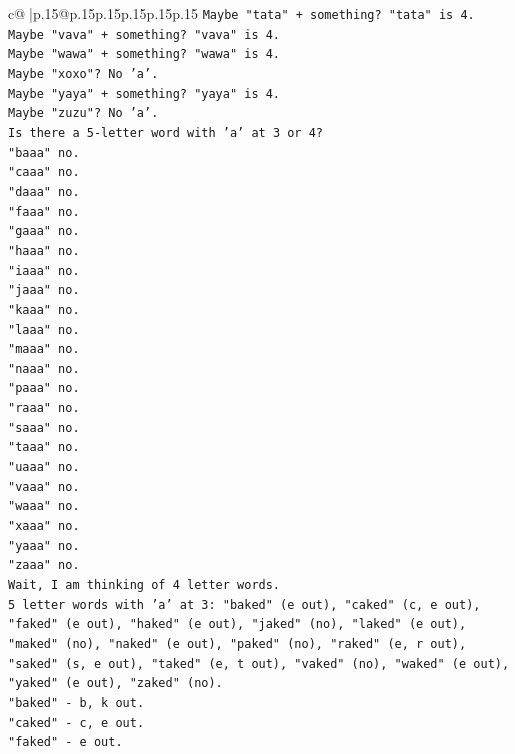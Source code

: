 \documentclass{article}
\begin{document}
{\begin{supertabular}{c@{$\;$}|p{.15\linewidth}@{}p{.15\linewidth}p{.15\linewidth}p{.15\linewidth}p{.15\linewidth}p{.15\linewidth}}
{{{\texttt{Maybe "tata" + something? "tata" is 4.} \\
\texttt{Maybe "vava" + something? "vava" is 4.} \\
\texttt{Maybe "wawa" + something? "wawa" is 4.} \\
\texttt{Maybe "xoxo"? No 'a'.} \\
\texttt{Maybe "yaya" + something? "yaya" is 4.} \\
\texttt{Maybe "zuzu"? No 'a'.} \\
\texttt{Is there a 5{-}letter word with 'a' at 3 or 4?} \\
\texttt{"baaa" no.} \\
\texttt{"caaa" no.} \\
\texttt{"daaa" no.} \\
\texttt{"faaa" no.} \\
\texttt{"gaaa" no.} \\
\texttt{"haaa" no.} \\
\texttt{"iaaa" no.} \\
\texttt{"jaaa" no.} \\
\texttt{"kaaa" no.} \\
\texttt{"laaa" no.} \\
\texttt{"maaa" no.} \\
\texttt{"naaa" no.} \\
\texttt{"paaa" no.} \\
\texttt{"raaa" no.} \\
\texttt{"saaa" no.} \\
\texttt{"taaa" no.} \\
\texttt{"uaaa" no.} \\
\texttt{"vaaa" no.} \\
\texttt{"waaa" no.} \\
\texttt{"xaaa" no.} \\
\texttt{"yaaa" no.} \\
\texttt{"zaaa" no.} \\
\texttt{Wait, I am thinking of 4 letter words.} \\
\texttt{5 letter words with 'a' at 3: "baked" (e out), "caked" (c, e out), "faked" (e out), "haked" (e out), "jaked" (no), "laked" (e out), "maked" (no), "naked" (e out), "paked" (no), "raked" (e, r out), "saked" (s, e out), "taked" (e, t out), "vaked" (no), "waked" (e out), "yaked" (e out), "zaked" (no).} \\
\texttt{"baked" {-} b, k out.} \\
\texttt{"caked" {-} c, e out.} \\
\texttt{"faked" {-} e out.} \\
}}}
\end{supertabular}}
\end{document}
